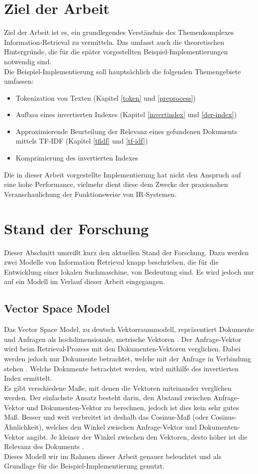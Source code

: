\section{Ziel der Arbeit}
Ziel der Arbeit ist es, ein grundlegendes Verständnis des Themenkomplexes Information-Retrieval zu vermitteln. Das umfasst auch die theoretischen Hintergründe, die für die später vorgestellten Beispiel-Implementierungen notwendig sind.
\\
Die Beispiel-Implementierung soll hauptsächlich die folgenden Themengebiete umfassen:\\
\begin{itemize}
	\item  Tokenization von Texten (Kapitel \ref{token} und \ref{preprocess})
	\item Aufbau eines invertierten Indexes (Kapitel \ref{invertindex} und \ref{der-index})
	\item Approximierende Beurteilung der Relevanz eines gefundenen Dokuments mittels TF-IDF (Kapitel \ref{tfidf} und \ref{tf-idf})
	\item Komprimierung des invertierten Indexes
\end{itemize}
Die in dieser Arbeit vorgestellte Implementierung hat nicht den Anspruch auf eine hohe Performance, vielmehr dient diese dem Zwecke der praxisnahen Veranschaulichung der Funktionsweise von IR-Systemen.

\section{Stand der Forschung}
Dieser Abschnitt umreißt kurz den aktuellen Stand der Forschung. Dazu werden zwei Modelle von Information Retrieval knapp beschrieben, die für die Entwicklung einer lokalen Suchmaschine, von Bedeutung sind. Es wird jedoch nur auf ein Modell im Verlauf dieser Arbeit eingegangen.
\\

\subsection{Vector Space Model}
Das Vector Space Model, zu deutsch Vektorraummodell, repräsentiert Dokumente und Anfragen als hochdimensionale, metrische Vektoren \cite{VR_Retrieval}.
Der Anfrage-Vektor wird beim Retrieval-Prozess mit den Dokumenten-Vektoren verglichen. Dabei werden jedoch nur Dokumente betrachtet, welche mit der Anfrage in Verbindung stehen \cite{klass_IR}. Welche Dokumente betrachtet werden, wird mithilfe des invertierten Index ermittelt.
\\
Es gibt verschiedene Maße, mit denen die Vektoren miteinander verglichen werden. Der einfachste Ansatz besteht darin, den Abstand zwischen Anfrage-Vektor und Dokumenten-Vektor zu berechnen, jedoch ist dies kein sehr gutes Maß. Besser und weit verbreitet ist deshalb das Cosinus-Maß (oder Cosinus-Ähnlichkeit), welches den Winkel zwischen Anfrage-Vektor und Dokumenten-Vektor angibt. Je kleiner der Winkel zwischen den Vektoren, desto höher ist die Relevanz des Dokuments \cite{IR_Uni_Duisburg}.
\\
Dieses Modell wir im Rahmen dieser Arbeit genauer beleuchtet und als Grundlage für die Beispiel-Implementierung genutzt.

